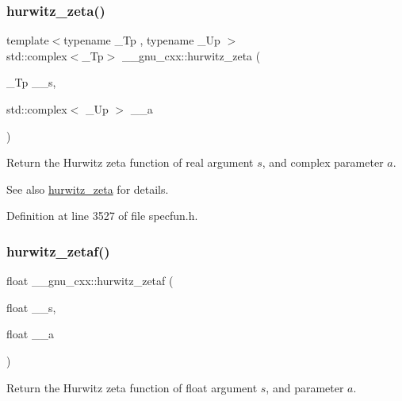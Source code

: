 \subsubsection{\texorpdfstring{hurwitz\+\_\+zeta()}{hurwitz\_zeta()}\hspace{0.1cm}{\footnotesize\ttfamily [2/2]}}
{\footnotesize\ttfamily template$<$typename \+\_\+\+Tp , typename \+\_\+\+Up $>$ \\
std\+::complex$<$\+\_\+\+Tp$>$ \+\_\+\+\_\+gnu\+\_\+cxx\+::hurwitz\+\_\+zeta (\begin{DoxyParamCaption}\item[{\+\_\+\+Tp}]{\+\_\+\+\_\+s,  }\item[{std\+::complex$<$ \+\_\+\+Up $>$}]{\+\_\+\+\_\+a }\end{DoxyParamCaption})}

Return the Hurwitz zeta function of real argument $ s $, and complex parameter $ a $.

\begin{DoxySeeAlso}{See also}
\hyperlink{group__gnu__math__spec__func_ga7b167ce1c8d9aa6aad40fc83a95733bd}{hurwitz\+\_\+zeta} for details. 
\end{DoxySeeAlso}


Definition at line 3527 of file specfun.\+h.

\mbox{\label{group__gnu__math__spec__func_gaa745d7f2edde060ed2f22817ad89df1f}} 
\subsubsection{\texorpdfstring{hurwitz\+\_\+zetaf()}{hurwitz\_zetaf()}}
{\footnotesize\ttfamily float \+\_\+\+\_\+gnu\+\_\+cxx\+::hurwitz\+\_\+zetaf (\begin{DoxyParamCaption}\item[{float}]{\+\_\+\+\_\+s,  }\item[{float}]{\+\_\+\+\_\+a }\end{DoxyParamCaption})\hspace{0.3cm}{\ttfamily [inline]}}

Return the Hurwitz zeta function of {\ttfamily float} argument $ s $, and parameter $ a $.

